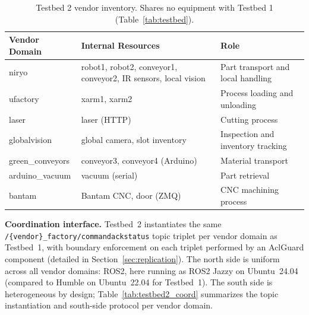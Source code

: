 \documentclass[a4paper,fleqn]{cas-dc}
\begin{document}
\begin{table}[h]
\centering
\caption{Testbed 2 vendor inventory. Shares no equipment with Testbed 1 (Table~\ref{tab:testbed}).}
\label{tab:testbed2_vendors}
\begin{tabular}{lll}
\toprule
\textbf{Vendor Domain} & \textbf{Internal Resources} & \textbf{Role} \\
\midrule
niryo            & robot1, robot2, conveyor1, conveyor2, IR sensors, local vision & Part transport and local handling \\
ufactory         & xarm1, xarm2 & Process loading and unloading \\
laser            & laser (HTTP) & Cutting process \\
globalvision     & global camera, slot inventory & Inspection and inventory tracking \\
green\_conveyors & conveyor3, conveyor4 (Arduino) & Material transport \\
arduino\_vacuum  & vacuum (serial) & Part retrieval \\
bantam           & Bantam CNC, door (ZMQ) & CNC machining process \\
\bottomrule
\end{tabular}
\end{table}

\textbf{Coordination interface.} Testbed~2 instantiates the same \texttt{/\{vendor\}\_factory/command\textbar ack\textbar status} topic triplet per vendor domain as Testbed~1, with boundary enforcement on each triplet performed by an AclGuard component (detailed in Section~\ref{sec:replication}). The north side is uniform across all vendor domains: ROS2, here running as ROS2 Jazzy on Ubuntu~24.04 (compared to Humble on Ubuntu~22.04 for Testbed~1). The south side is heterogeneous by design; Table~\ref{tab:testbed2_coord} summarizes the topic instantiation and south-side protocol per vendor domain.
\end{document}
